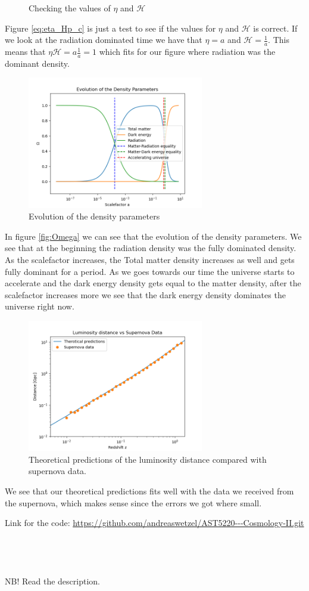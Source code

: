\documentclass{article}
\begin{document}
\begin{multicols}{2}
\begin{figure}[H]
	\caption{Checking the values of $\eta$ and $\mathcal{H}$}
	\label{eq:eta_Hp_c}
\end{figure}
Figure \eqref{eq:eta_Hp_c} is just a test to see if the values for $\eta$ and $\mathcal{H}$ is correct. If we look at the radiation dominated time we have that $\eta=a$ and $\mathcal{H}=\frac{1}{a}$. This means that $\eta\mathcal{H}=a\frac{1}{a}=1$ which fits for our figure where radiation was the dominant density. 
\begin{figure}[H]
	\centering
	\includegraphics[width=77mm]{Omega.png}
	\caption{Evolution of the density parameters}
	\label{fig:Omega}
\end{figure}
In figure \eqref{fig:Omega} we can see that the evolution of the density parameters. We see that at the beginning the radiation density was the fully dominated density. As the scalefactor increases, the Total matter density increases as well and gets fully dominant for a period. As we goes towards our time the universe starts to accelerate and the dark energy density gets equal to the matter density, after the scalefactor increases more we see that the dark energy density dominates the universe right now. \\
\begin{figure}[H]
	\centering
	\includegraphics[width=77mm]{LD_vs_SN.png}
	\caption{Theoretical predictions of the luminosity distance compared with supernova data.}
	\label{fig:LD_vs_SN}
\end{figure}
We see that our theoretical predictions fits well with the data we received from the supernova, which makes sense since the errors we got where small.
\end{multicols}
\clearpage
Link for the code: \url{https://github.com/andreaswetzel/AST5220---Cosmology-II.git}\\
\\
\\
\\
\\
NB! Read the description.
\clearpage
\appendix %
\end{document}
